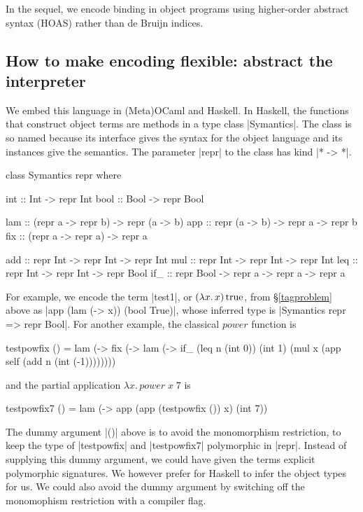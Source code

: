 \documentclass[preprint]{sigplanconf}
\newcommand{\fun}[1]{\mathopen{\lambda\mathord{#1}.\,}}
\newcommand{\True}{\mathinner{\mathrm{true}}}
\begin{document}
In the sequel, we encode binding in object programs using higher-order
abstract syntax (HOAS) \citep{miller-manipulating,pfenning-higher-order}
rather than de Bruijn indices.

\subsection{How to make encoding flexible: abstract the interpreter}
\label{encoding}

We embed this language in (Meta)OCaml and Haskell.  In Haskell,
the functions that construct object terms are methods in a type class
|Symantics|. The class is so named because its interface gives the syntax for
the object language and its instances give the semantics.
The parameter |repr| to the class has kind |* -> *|.
\begin{code}
class Symantics repr where

  int  :: Int  -> repr Int
  bool :: Bool -> repr Bool

  lam :: (repr a -> repr b) -> repr (a -> b)
  app :: repr (a -> b) -> repr a -> repr b
  fix :: (repr a -> repr a) -> repr a

  add :: repr Int -> repr Int -> repr Int
  mul :: repr Int -> repr Int -> repr Int
  leq :: repr Int -> repr Int -> repr Bool
  if_ :: repr Bool -> repr a -> repr a -> repr a
\end{code}
For example, we encode the term |test1|, or $(\fun{x}x)\True$, from
\S\ref{tagproblem} above as |app (lam (\x -> x)) (bool True)|,
whose inferred type is |Symantics repr => repr Bool|.
For another example, the classical $\mathit{power}$ function is
\begin{code}
testpowfix () = 
  lam (\x -> fix (\self -> lam (\n ->
  if_ (leq n (int 0)) (int 1)
      (mul x (app self (add n (int (-1))))))))
\end{code}
and the partial application $\fun{x} \mathit{power}\;x\;7$ is
\begin{code}
testpowfix7 () = 
  lam (\x -> app (app (testpowfix ()) x)
                 (int 7))
\end{code}
The dummy argument |()| above is to avoid the monomorphism
restriction, to keep the type of |testpowfix| and |testpowfix7|
polymorphic in |repr|. Instead of supplying this dummy
argument, we could have given the terms explicit polymorphic
signatures.  We however prefer for
Haskell to infer the object types for us. We could also
avoid the dummy argument by switching off the monomophism restriction
with a compiler flag.
\end{document}
